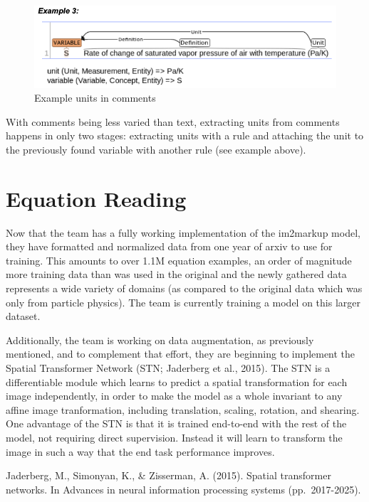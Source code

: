 \documentclass[article, 12pt, oneside]{memoir}
\begin{document}
\begin{figure}
\centering
\includegraphics{figs/units_comment.png}
\caption{Example units in comments}
\end{figure}

With comments being less varied than text, extracting units from
comments happens in only two stages: extracting units with a rule and
attaching the unit to the previously found variable with another rule
(see example above).

\hypertarget{equation-reading}{%
\section{Equation Reading}\label{equation-reading}}

Now that the team has a fully working implementation of the im2markup
model, they have formatted and normalized data from one year of arxiv to
use for training. This amounts to over 1.1M equation examples, an order
of magnitude more training data than was used in the original and the
newly gathered data represents a wide variety of domains (as compared to
the original data which was only from particle physics). The team is
currently training a model on this larger dataset.

Additionally, the team is working on data augmentation, as previously
mentioned, and to complement that effort, they are beginning to
implement the Spatial Transformer Network (STN; Jaderberg et al., 2015).
The STN is a differentiable module which learns to predict a spatial
transformation for each image independently, in order to make the model
as a whole invariant to any affine image tranformation, including
translation, scaling, rotation, and shearing. One advantage of the STN
is that it is trained end-to-end with the rest of the model, not
requiring direct supervision. Instead it will learn to transform the
image in such a way that the end task performance improves.

Jaderberg, M., Simonyan, K., \& Zisserman, A. (2015). Spatial
transformer networks. In Advances in neural information processing
systems (pp.~2017-2025).
\end{document}
